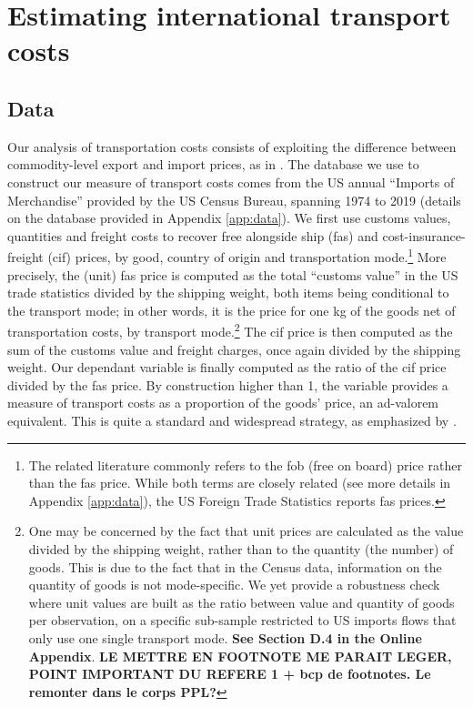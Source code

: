 \documentclass[a4paper,11pt]{article}
\begin{document}
\section{Estimating international transport costs\label{sec:data_method}}

\subsection{Data}

Our analysis of transportation costs consists of exploiting the difference between commodity-level export and import prices, as in \cite{hummels2007}. The database we use to construct our measure of transport costs comes from the US annual ``Imports of Merchandise'' provided by the US Census Bureau, spanning 1974 to 2019 (details on the database provided in Appendix \ref{app:data}). We first use customs values, quantities and freight costs to recover free alongside ship (fas) and cost-insurance-freight (cif) prices, by good, country of origin and transportation mode.\footnote{The related literature commonly refers to the fob (free on board) price rather than the fas price. While both terms are closely related (see more details in Appendix \ref{app:data}), the US Foreign Trade Statistics reports fas prices.} More precisely, the (unit) fas price is computed as the total ``customs value'' in the US trade statistics divided by the shipping weight, both items being conditional to the transport mode; in other words, it is the price for one kg of the goods net of transportation costs, by transport mode.\footnote{One may be concerned by the fact that unit prices are calculated as the value divided by the shipping weight, rather than to the quantity (the number) of goods. This is due to the fact that in the Census data, information on the quantity of goods is not mode-specific. We yet provide a robustness check where unit values are built as the ratio between value and quantity of goods per observation, on a specific sub-sample restricted to US imports flows that only use one single transport mode. \textbf{See Section D.4 in the Online Appendix}. \textbf{LE METTRE EN FOOTNOTE ME PARAIT LEGER, POINT IMPORTANT DU REFERE 1 + bcp de footnotes. Le remonter dans le corps PPL?}} The cif price is then computed as the sum of the customs value and freight charges, once again divided by the shipping weight. Our dependant variable is finally computed as the ratio of the cif price divided by the fas price. By construction higher than 1, the variable provides a measure of transport costs as a proportion of the goods' price, an ad-valorem equivalent. This is quite a standard and widespread strategy, as emphasized by \cite{anderson_wincoop_jel}.
\end{document}
